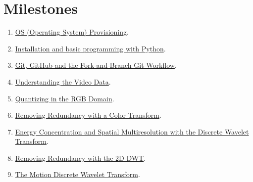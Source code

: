 \section{Milestones}
\begin{enumerate}
\item \href{https://sistemas-multimedia.github.io/study_guide/01-provisioning/}{OS (Operating System) Provisioning}.
\item \href{https://sistemas-multimedia.github.io/study_guide/02-python/}{Installation and basic programming with Python}.
\item \href{https://sistemas-multimedia.github.io/study_guide/03-git/}{Git, GitHub and the Fork-and-Branch Git Workflow}.
\item \href{https://sistemas-multimedia.github.io/study_guide/04-the_data/}{Understanding the Video Data}.
\item \href{https://sistemas-multimedia.github.io/study_guide/05-quantization/}{Quantizing in the RGB Domain}.
\item \href{https://sistemas-multimedia.github.io/study_guide/06-color_transform/}{Removing Redundancy with a Color Transform}.
\item \href{https://sistemas-multimedia.github.io/study_guide/07-DWT/}{Energy Concentration and Spatial Multiresolution with the Discrete Wavelet Transform}.
\item \href{https://sistemas-multimedia.github.io/study_guide/08-2D-DWT/}{Removing Redundancy with the 2D-DWT}.
\item \href{https://sistemas-multimedia.github.io/study_guide/09-MDWT/}{The Motion Discrete Wavelet Transform}.
\end{enumerate}

